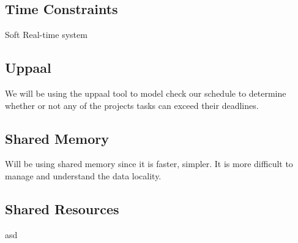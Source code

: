 \subsection{\textbf{Time Constraints}}
Soft Real-time system
\subsection{\textbf{Uppaal}}
We will be using the uppaal tool to model check our schedule to determine whether or not any of the projects tasks can exceed their deadlines.
\subsection{\textbf{Shared Memory}}
 Will be using shared memory since it is faster, simpler. It is more difficult to manage and understand the data locality.
\subsection{\textbf{Shared Resources}} 
 asd





















